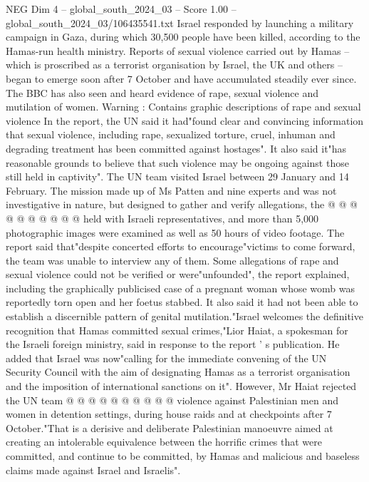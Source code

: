 \begin{textsample}{NEG Dim 4 – global\_south\_2024\_03 – Score 1.00 – global\_south\_2024\_03/106435541.txt}  \label{ex:f4_neg_357}
Israel responded by launching a military campaign in Gaza, during which 30,500 people have been killed, according to the Hamas-run health ministry.
Reports of sexual violence carried out by Hamas -- which is proscribed as a terrorist organisation by Israel, the UK and others -- began to emerge soon after 7 October and have accumulated steadily ever since.
The BBC has also seen and heard evidence of rape, sexual violence and mutilation of women.
Warning : Contains graphic descriptions of rape and sexual violence In the report, the UN said it had"found clear and convincing information that sexual violence, including rape, sexualized torture, cruel, inhuman and degrading treatment has been committed against hostages".
It also said it"has reasonable grounds to believe that such violence may be ongoing against those still held in captivity".
The UN team visited Israel between 29 January and 14 February.
The mission made up of Ms Patten and nine experts and was not investigative in nature, but designed to gather and verify allegations, the @ @ @ @ @ @ @ @ @ @ held with Israeli representatives, and more than 5,000 photographic images were examined as well as 50 hours of video footage.
The report said that"despite concerted efforts to encourage"victims to come forward, the team was unable to interview any of them.
Some allegations of rape and sexual violence could not be verified or were"unfounded", the report explained, including the graphically publicised case of a pregnant woman whose womb was reportedly torn open and her foetus stabbed.
It also said it had not been able to establish a discernible pattern of genital mutilation."Israel welcomes the definitive recognition that Hamas committed sexual crimes,"Lior Haiat, a spokesman for the Israeli foreign ministry, said in response to the report ' s publication.
He added that Israel was now"calling for the immediate convening of the UN Security Council with the aim of designating Hamas as a terrorist organisation and the imposition of international sanctions on it".
However, Mr Haiat rejected the UN team @ @ @ @ @ @ @ @ @ @ violence against Palestinian men and women in detention settings, during house raids and at checkpoints after 7 October."That is a derisive and deliberate Palestinian manoeuvre aimed at creating an intolerable equivalence between the horrific crimes that were committed, and continue to be committed, by Hamas and malicious and baseless claims made against Israel and Israelis".

\end{textsample}
